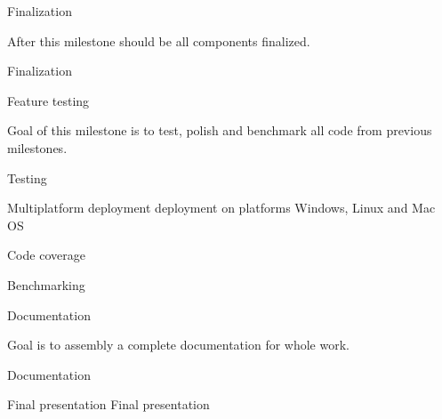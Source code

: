 	\itemm Finalization 
	
		\small After this milestone should be all components finalized. 
		
		\bwp
			\itemwp Finalization 
		\eenum
	
	\itemm Feature testing 
	
		\small Goal of this milestone is to test, polish and benchmark all code from previous milestones.
		
		\bwp
			\itemwp Testing 
			
			\itemwp Multiplatform deployment 
					\tiny deployment on platforms Windows, Linux and Mac OS
					
			\itemwp Code coverage 
			
			\itemwp Benchmarking 
		\eenum
	
	\itemm Documentation 
	
		\small Goal is to assembly a complete documentation for whole work.
		
		\bwp
			\itemwp Documentation 
		\eenum
	
	\itemm Final presentation 
		\bwp
			\itemwp Final presentation 
		\eenum
\eenum

